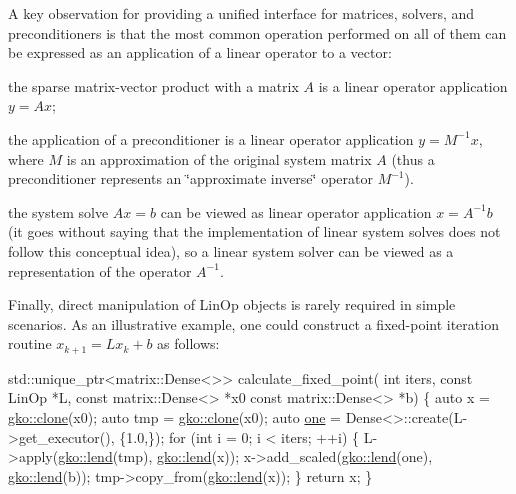 A key observation for providing a unified interface for matrices, solvers, and preconditioners is that the most common operation performed on all of them can be expressed as an application of a linear operator to a vector\+:


\begin{DoxyItemize}
\item the sparse matrix-\/vector product with a matrix $A$ is a linear operator application $y = Ax$;
\item the application of a preconditioner is a linear operator application $y = M^{-1}x$, where $M$ is an approximation of the original system matrix $A$ (thus a preconditioner represents an \char`\"{}approximate
    inverse\char`\"{} operator $M^{-1}$).
\item the system solve $Ax = b$ can be viewed as linear operator application $x = A^{-1}b$ (it goes without saying that the implementation of linear system solves does not follow this conceptual idea), so a linear system solver can be viewed as a representation of the operator $A^{-1}$.
\end{DoxyItemize}

Finally, direct manipulation of Lin\+Op objects is rarely required in simple scenarios. As an illustrative example, one could construct a fixed-\/point iteration routine $x_{k+1} = Lx_k + b$ as follows\+:


\begin{DoxyCode}
std::unique\_ptr<matrix::Dense<>> calculate\_fixed\_point(
        \textcolor{keywordtype}{int} iters, \textcolor{keyword}{const} LinOp *L, \textcolor{keyword}{const} matrix::Dense<> *x0
        \textcolor{keyword}{const} matrix::Dense<> *b)
\{
    \textcolor{keyword}{auto} x = \hyperlink{namespacegko_a1beb80750459e4201aa9d882d2d074c3}{gko::clone}(x0);
    \textcolor{keyword}{auto} tmp = \hyperlink{namespacegko_a1beb80750459e4201aa9d882d2d074c3}{gko::clone}(x0);
    \textcolor{keyword}{auto} \hyperlink{namespacegko_a0059e27f8f4bc348ff65c1e60caf47c8}{one} = Dense<>::create(L->get\_executor(), \{1.0,\});
    \textcolor{keywordflow}{for} (\textcolor{keywordtype}{int} i = 0; i < iters; ++i) \{
        L->apply(\hyperlink{namespacegko_aa8cb4876b72e5e1036ea9575443c439b}{gko::lend}(tmp), \hyperlink{namespacegko_aa8cb4876b72e5e1036ea9575443c439b}{gko::lend}(x));
        x->add\_scaled(\hyperlink{namespacegko_aa8cb4876b72e5e1036ea9575443c439b}{gko::lend}(one), \hyperlink{namespacegko_aa8cb4876b72e5e1036ea9575443c439b}{gko::lend}(b));
        tmp->copy\_from(\hyperlink{namespacegko_aa8cb4876b72e5e1036ea9575443c439b}{gko::lend}(x));
    \}
    \textcolor{keywordflow}{return} x;
\}
\end{DoxyCode}


